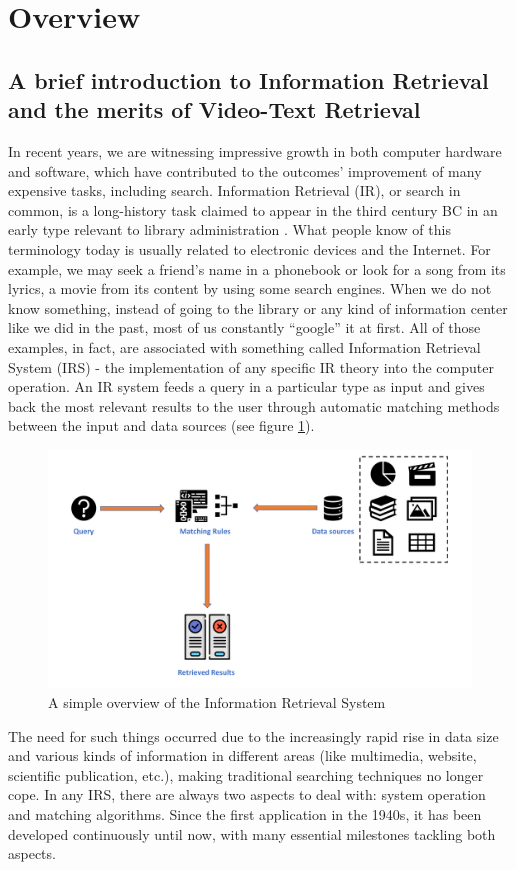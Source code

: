 \section{Overview}
\label{sec:overview}

\subsection{A brief introduction to Information Retrieval and the merits of Video-Text Retrieval}
In recent years, we are witnessing impressive growth in both computer hardware and software, which have contributed to the outcomes’ improvement of many expensive tasks, including search.
Information Retrieval (IR), or search in common, is a long-history task claimed to appear in the third century BC in an early type relevant to library administration \cite{eliot2009companion}.
What people know of this terminology today is usually related to electronic devices and the Internet. For example, we may seek a friend’s name in a phonebook or look for a song from its lyrics, a movie from its content by using some search engines.
When we do not know something, instead of going to the library or any kind of information center like we did in the past, most of us constantly “google” it at first.
All of those examples, in fact, are associated with something called Information Retrieval System (IRS) - the implementation of any specific IR theory into the computer operation.
An IR system feeds a query in a particular type as input and gives back the most relevant results to the user through automatic matching methods between the input and data sources (see figure \ref{fig:IR_structure}).
\begin{figure}[!t]
    \centering
    \includegraphics[width=\linewidth]{resources/images/overview/IR_structure.pdf}
    \caption{A simple overview of the Information Retrieval System}
    \label{fig:IR_structure}
\end{figure}
The need for such things occurred due to the increasingly rapid rise in data size and various kinds of information in different areas (like multimedia, website, scientific publication, etc.), making traditional searching techniques no longer cope.
In any IRS, there are always two aspects to deal with: system operation and matching algorithms. Since the first application in the 1940s, it has been developed continuously until now, with many essential milestones \cite{sanderson2012history} tackling both aspects.

